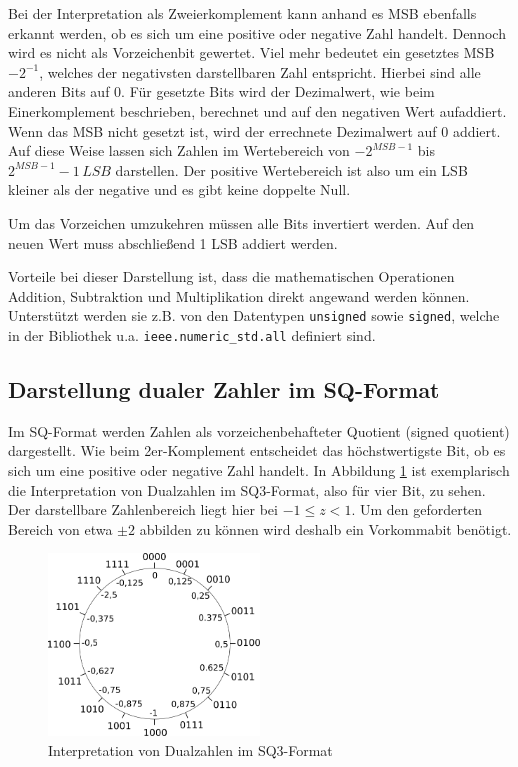 Bei der Interpretation als Zweierkomplement kann anhand es MSB ebenfalls erkannt werden, ob es sich um eine positive oder negative Zahl handelt. Dennoch wird es nicht
als Vorzeichenbit gewertet. Viel mehr bedeutet ein gesetztes MSB $-2^{-1}$, welches der negativsten darstellbaren Zahl entspricht. Hierbei sind alle anderen 
Bits auf 0. Für gesetzte Bits wird der Dezimalwert, wie beim Einerkomplement beschrieben, berechnet und auf den negativen Wert aufaddiert. Wenn das MSB nicht gesetzt
ist, wird der errechnete Dezimalwert auf 0 addiert. Auf diese Weise lassen sich Zahlen im Wertebereich von $-2^{MSB-1}$ bis $2^{MSB-1}-1 \,LSB$ darstellen. Der positive
Wertebereich ist also um ein LSB kleiner als der negative und es gibt keine doppelte Null.

Um das Vorzeichen umzukehren müssen alle Bits invertiert werden. Auf den neuen Wert muss abschließend 1 LSB addiert werden.

Vorteile bei dieser Darstellung ist, dass die mathematischen Operationen Addition, Subtraktion und Multiplikation direkt angewand werden können. Unterstützt werden sie z.B. 
von den Datentypen \texttt{unsigned} sowie \texttt{signed}, welche in der Bibliothek u.a. \texttt{ieee.numeric\_std.all} definiert sind.


\subsection{Darstellung dualer Zahler im SQ-Format}
Im SQ-Format werden Zahlen als vorzeichenbehafteter Quotient (signed quotient) dargestellt. Wie beim 2er-Komplement entscheidet das höchstwertigste Bit, ob es sich um eine
positive oder negative Zahl handelt. In Abbildung \ref{pic:SQKreis} ist exemplarisch die Interpretation von Dualzahlen im SQ3-Format, also für vier Bit, zu sehen.
Der darstellbare Zahlenbereich liegt hier bei $-1\leq z < 1$. Um den geforderten Bereich von etwa $\pm2$ abbilden zu können wird deshalb ein Vorkommabit benötigt. 




\begin{figure}[ht!]
 \centering
 \includegraphics[width=0.5\textwidth]{img/SQ-Kreis.png}
 \caption{Interpretation von Dualzahlen im SQ3-Format}
 \label{pic:SQKreis}
\end{figure}






